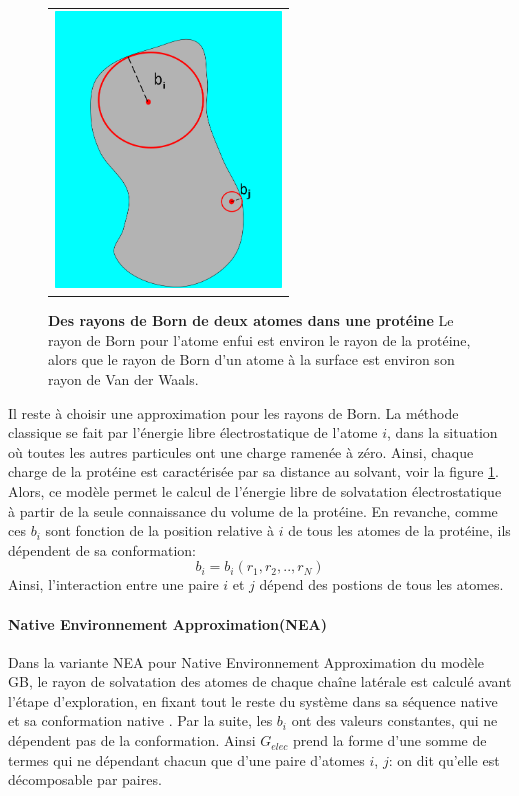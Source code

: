    \begin{figure}[!htbp]
     \centering
     \begin{tabular}{c}
       \includegraphics[width=6cm]{figure/rayon_Born.png} &
     \end{tabular}
     
     \caption{\textbf{Des rayons de Born de deux atomes dans une protéine} Le rayon de Born pour l'atome enfui est environ le rayon de la protéine, alors que le rayon de Born d'un atome à la surface est environ son rayon de Van der Waals.} 
\label{graph:rayonBorn}
   \end{figure}

Il reste à choisir une approximation pour les rayons de Born. La méthode classique se fait par l'énergie libre électrostatique de l'atome $i$, dans la situation où toutes les autres particules ont une charge ramenée à zéro. Ainsi, chaque charge de la protéine est caractérisée par sa distance au solvant, voir la figure \ref{graph:rayonBorn}. Alors, ce modèle permet le calcul de l'énergie libre de solvatation électrostatique à partir de la seule connaissance du volume de la protéine. En revanche, comme ces $b_i$ sont fonction de la position relative à $i$ de tous les atomes de la protéine, ils dépendent de sa conformation:
\begin{displaymath}
b_i=b_i(r_1,r_2,..,r_N)
\end{displaymath}
Ainsi, l'interaction entre une paire $i$ et $j$ dépend des postions de tous les atomes.
\paragraph{\og Native Environnement Approximation\fg (NEA)}
\label{NEA}
Dans la variante NEA pour \og Native Environnement Approximation \fg  du modèle GB, le rayon de solvatation des atomes de chaque chaîne latérale est calculé avant l'étape d'exploration, en fixant tout le reste du système dans sa séquence native et sa conformation native \cite{Polydorides11,Simonson13,Gaillard14}. Par la suite, les $b_i$ ont des valeurs constantes, qui ne dépendent pas de la conformation. Ainsi $G_{elec}$ prend la forme d'une somme de termes qui ne dépendant chacun que d'une paire d'atomes $i$, $j$: on dit qu'elle est \og décomposable par paires\fg.

